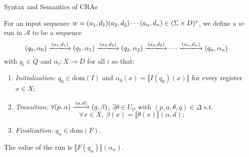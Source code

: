 \documentclass[landscape]{beamer}
\newcommand{\calO}{\mathcal{O}}
\newcommand{\calA}{\mathcal{A}}
\newcommand{\sem}[1]{\llbracket {#1} \rrbracket}
\newcommand{\dom}{\mathrm{dom}}
\begin{document}
\begin{frame}{Syntax and Semantics of CRAs}
    \begin{definition}
    For an input sequence $w = (a_1,d_1)(a_2,d_2)\cdots(a_n,d_n) \in (\Sigma \times D)^*$,
    we define a \alert{$w$-run} in $\calA$ to be a sequence
    \[
        (q_0,\alpha_0)
        \xlongrightarrow{(a_1,d_1)} (q_1,\alpha_1)
        \xlongrightarrow{(a_2,d_2)} (q_2,\alpha_2)
        \xlongrightarrow{(a_3,d_3)} \cdots
        \xlongrightarrow{(a_n,d_n)} (q_n,\alpha_n)
    \]
    with $q_i \in Q$ and $\alpha_i: X \to D$ for all $i$ so that:
    \begin{enumerate}
        \item \textit{Initialization:}
            $q_0 \in \dom(I)$ and
            $\alpha_0(x) = \sem{I(q_0)(x)}$ for every register $x \in X$;
        \item \textit{Transition:}
            $\forall (p,\alpha)\xlongrightarrow{(a,d)}(q,\beta)$,
            $\exists \theta \in U_\calO \text{ with } (p,a,\theta,q) \in \Delta$ s.t.
            \[
                \forall x \in X, \: \beta(x) = \sem{\theta(x)}(\alpha, d);
            \]
        \item \textit{Finalization:}
            $q_n \in \dom(F)$.
    \end{enumerate}
    
    The \alert{value} of the run is $\sem{F(q_n)}(\alpha_n)$.
    \end{definition}
\end{frame}
\end{document}
